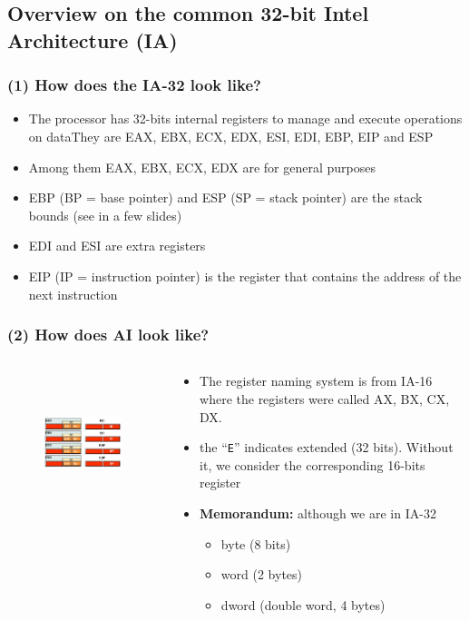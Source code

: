 \documentclass[]{beamer}
\begin{document}
\subsection{Overview on the common 32-bit Intel Architecture (IA)}
\begin{frame}
  \frametitle{(1) How does the IA-32 look like?}
  \begin{itemize}
  \item{The processor has 32-bits internal registers to manage and execute operations on data\newline They are EAX, EBX, ECX, EDX, ESI, EDI, EBP, EIP and ESP }
  \item{Among them EAX, EBX, ECX, EDX are for general purposes}
  \item{EBP (BP = base pointer) and ESP (SP = stack pointer) are the stack bounds (see in a few slides)}
  \item{EDI and ESI are extra registers}
  \item{EIP (IP = instruction pointer) is the register that contains the address of the next instruction}
  \end{itemize}
\end{frame}
\begin{frame}
  \frametitle{(2) How does AI look like?}
  \begin{columns}
    \begin{column}{2.5in}
      \begin{figure}
        \includegraphics[height=1.6in]{images/registers.jpeg}
        \label{Registers Division}
      \end{figure}
    \end{column}
    \begin{column}{2.5in}
      \begin{itemize}
      \item The register naming system is from IA-16 where the
        registers were called AX, BX, CX, DX.
      \item the ``\texttt{E}'' indicates extended (32 bits). Without
        it, we consider the corresponding 16-bits register
      \item \textbf{Memorandum:} although we are in IA-32
        \begin{itemize}
        \item byte (8 bits)
        \item word (2 bytes)
        \item dword (double word, 4 bytes)
        \end{itemize}
      \end{itemize}
    \end{column}
  \end{columns}
\end{frame}
\end{document}
